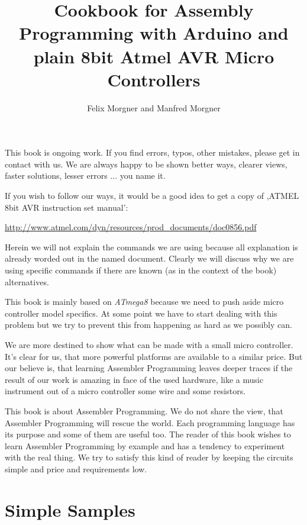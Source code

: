 \documentclass[twoside,english,12pt,authoryear,openright]{book}
\newcommand{\at}{\textit{ATmega8} }
\begin{document}

\title{Cookbook for Assembly Programming with Arduino and plain 8bit Atmel AVR Micro Controllers}

\author{Felix Morgner and Manfred Morgner}


\maketitle

This book is ongoing work. If you find errors, typos, other mistakes, please get in contact with us. We are always happy to be shown better ways, clearer views, faster solutions, lesser errors ... you name it.

If you wish to follow our ways, it would be a good idea to get a copy of  ,ATMEL 8bit AVR instruction set manual':

\url{http://www.atmel.com/dyn/resources/prod_documents/doc0856.pdf}

Herein we will not explain the commands we are using because all explanation is already worded out in the named document. Clearly we will discuss why we are using specific commands if there are known (as in the context of the book) alternatives.

This book is mainly based on \at because we need to push aside micro controller model specifics. At some point we have to start dealing with this problem but we try to prevent this from happening as hard as we possibly can.

We are more destined to show what can be made with a small micro controller. It's clear for us, that more powerful platforms are available to a similar price. But our believe is, that learning Assembler Programming leaves deeper traces if the result of our work is amazing in face of the used hardware, like a music instrument out of a micro controller some wire and some resistors.

This book is about Assembler Programming. We do not share the view, that Assembler Programming will rescue the world. Each programming language has its purpose and some of them are useful too. The reader of this book wishes to learn Assembler Programming by example and has a tendency to experiment with the real thing. We try to satisfy this kind of reader by keeping the circuits simple and price and requirements low.


\tableofcontents{}
\listoffigures{}

\part{Simple Samples}
\end{document}
